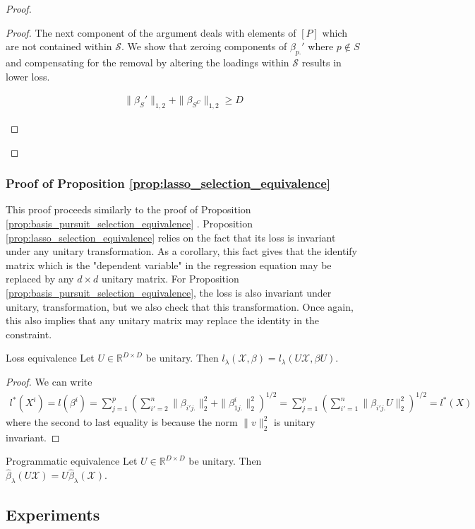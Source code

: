 \begin{proof}
\begin{proof}
The next component of the argument deals with elements of $[P]$ which are not contained within $\mathcal S$.
We show that zeroing components of $\beta_{p.}'$ where $p \not \in S$ and compensating for the removal by altering the loadings within $\mathcal S$ results in lower loss.


\begin{proposition}
\begin{align}
\|\beta_{S}'\|_{1,2} + \|\beta_{S^C}\|_{1,2} \geq D
\end{align}
\end{proposition}
\end{proof}

\end{proof}
\subsubsection{Proof of Proposition \ref{prop:lasso_selection_equivalence} }

This proof proceeds similarly to the proof of Proposition  \ref{prop:basis_pursuit_selection_equivalence} .
Proposition \ref{prop:lasso_selection_equivalence} relies on the fact that its loss is invariant under any unitary transformation.
As a corollary, this fact gives that the identify matrix which is the "dependent variable" in the regression equation may be replaced by any $d \times d$ unitary matrix.
For Proposition \ref{prop:basis_pursuit_selection_equivalence}, the loss is also invariant under unitary, transformation, but we also check that this transformation.
Once again, this also implies that any unitary matrix may replace the identity in the constraint.

 \begin{proposition}{Loss equivalence}
 \label{prop:lasso_loss_equivalence}
 Let $U \in \mathbb R^{D \times D}$ be unitary.
 Then $l_\lambda (\mathcal X, \beta) = l_\lambda (U \mathcal X, \beta U)$.
\end{proposition}

\begin{proof}
We can write 
\begin{eqnarray}
l^*(X^i) = l(\beta^i) = \sum_{j = 1}^p (\sum_{i'=2}^n \| \beta_{i'j.} \|_2^2 +  \|  \beta_{1j.}^i \|_2^2 )^{1/2}=  \sum_{j = 1}^p (\sum_{i'=1}^n \| \beta_{i'j.} U \|_2^2)^{1/2} = l^*(X)
\end{eqnarray}
where the second to last equality is because the norm $\|v\|_2^2 $ is unitary invariant.

\end{proof}

\begin{proposition}{Programmatic equivalence}
\label{prop:lasso_program_equivalence}
 Let $U \in \mathbb R^{D \times D}$ be unitary.
 Then $\hat \beta_{\lambda}  (U \mathcal X) = U\hat \beta_{\lambda} (\mathcal X)$.
\end{proposition}



\subsection{Experiments}



